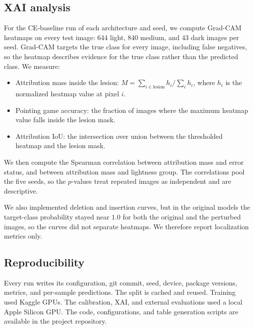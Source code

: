 \subsection{XAI analysis}

For the CE-baseline run of each architecture and seed, we compute Grad-CAM heatmaps on every test image: 644 light, 840 medium, and 43 dark images per seed. Grad-CAM targets the true class for every image, including false negatives, so the heatmap describes evidence for the true class rather than the predicted class. We measure:

\begin{itemize}
  \item Attribution mass inside the lesion: $M=\sum_{i\in\mathrm{lesion}}h_i/\sum_i h_i$, where $h_i$ is the normalized heatmap value at pixel $i$.
  \item Pointing game accuracy: the fraction of images where the maximum heatmap value falls inside the lesion mask.
  \item Attribution IoU: the intersection over union between the thresholded heatmap and the lesion mask.
\end{itemize}

We then compute the Spearman correlation between attribution mass and error status, and between attribution mass and lightness group. The correlations pool the five seeds, so the $p$-values treat repeated images as independent and are descriptive.

We also implemented deletion and insertion curves, but in the original models the target-class probability stayed near $1.0$ for both the original and the perturbed images, so the curves did not separate heatmaps. We therefore report localization metrics only.

\subsection{Reproducibility}

Every run writes its configuration, git commit, seed, device, package versions, metrics, and per-sample predictions. The split is cached and reused. Training used Kaggle GPUs. The calibration, XAI, and external evaluations used a local Apple Silicon GPU. The code, configurations, and table generation scripts are available in the project repository.
